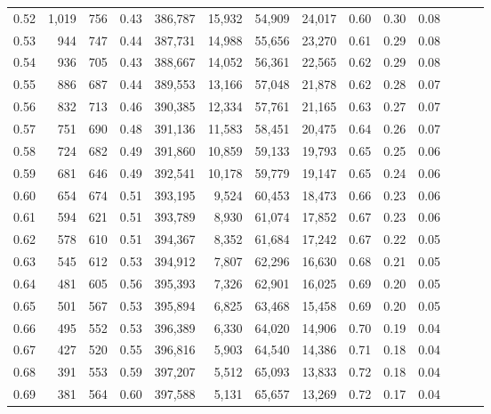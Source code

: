 \begin{tabular}{rrrrrrrrrrrrrr}
0.52 &   1,019 &    756 &  0.43 &  386,787 &   15,932 &  54,909 &  24,017 &  0.60 &  0.30 &      0.08 \\
0.53 &     944 &    747 &  0.44 &  387,731 &   14,988 &  55,656 &  23,270 &  0.61 &  0.29 &      0.08 \\
0.54 &     936 &    705 &  0.43 &  388,667 &   14,052 &  56,361 &  22,565 &  0.62 &  0.29 &      0.08 \\
0.55 &     886 &    687 &  0.44 &  389,553 &   13,166 &  57,048 &  21,878 &  0.62 &  0.28 &      0.07 \\
0.56 &     832 &    713 &  0.46 &  390,385 &   12,334 &  57,761 &  21,165 &  0.63 &  0.27 &      0.07 \\
0.57 &     751 &    690 &  0.48 &  391,136 &   11,583 &  58,451 &  20,475 &  0.64 &  0.26 &      0.07 \\
0.58 &     724 &    682 &  0.49 &  391,860 &   10,859 &  59,133 &  19,793 &  0.65 &  0.25 &      0.06 \\
0.59 &     681 &    646 &  0.49 &  392,541 &   10,178 &  59,779 &  19,147 &  0.65 &  0.24 &      0.06 \\
0.60 &     654 &    674 &  0.51 &  393,195 &    9,524 &  60,453 &  18,473 &  0.66 &  0.23 &      0.06 \\
0.61 &     594 &    621 &  0.51 &  393,789 &    8,930 &  61,074 &  17,852 &  0.67 &  0.23 &      0.06 \\
0.62 &     578 &    610 &  0.51 &  394,367 &    8,352 &  61,684 &  17,242 &  0.67 &  0.22 &      0.05 \\
0.63 &     545 &    612 &  0.53 &  394,912 &    7,807 &  62,296 &  16,630 &  0.68 &  0.21 &      0.05 \\
0.64 &     481 &    605 &  0.56 &  395,393 &    7,326 &  62,901 &  16,025 &  0.69 &  0.20 &      0.05 \\
0.65 &     501 &    567 &  0.53 &  395,894 &    6,825 &  63,468 &  15,458 &  0.69 &  0.20 &      0.05 \\
0.66 &     495 &    552 &  0.53 &  396,389 &    6,330 &  64,020 &  14,906 &  0.70 &  0.19 &      0.04 \\
0.67 &     427 &    520 &  0.55 &  396,816 &    5,903 &  64,540 &  14,386 &  0.71 &  0.18 &      0.04 \\
0.68 &     391 &    553 &  0.59 &  397,207 &    5,512 &  65,093 &  13,833 &  0.72 &  0.18 &      0.04 \\
0.69 &     381 &    564 &  0.60 &  397,588 &    5,131 &  65,657 &  13,269 &  0.72 &  0.17 &      0.04 \\

\end{tabular}
